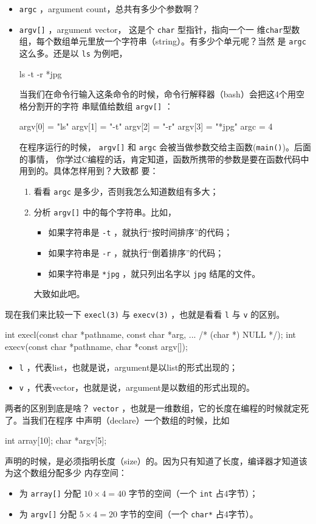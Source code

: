 \documentclass{wx672ctexart}
\begin{document}
\begin{itemize}
\item \texttt{argc} ，argument count，总共有多少个参数啊？
\item \texttt{argv[]} ，argument vector， 这是个 \texttt{char} 型指针，指向一个一
  维\texttt{char}型数组，每个数组单元里放一个字符串（string）。有多少个单元呢？当然
  是 \texttt{argc} 这么多。还是以 \texttt{ls} 为例吧，
\begin{shellcode}
ls -t -r *jpg
\end{shellcode}
当我们在命令行输入这条命令的时候，命令行解释器（bash）会把这4个用空格分割开的字符
串赋值给数组 \texttt{argv[]} ：
\begin{ccode}
argv[0] = "ls"
argv[1] = "-t"
argv[2] = "-r"
argv[3] = "*jpg"
argc = 4
\end{ccode}
在程序运行的时候， \texttt{argv[]} 和 \texttt{argc} 会被当做参数交给主函数(\texttt{main()})。后面的事情，
你学过C编程的话，肯定知道，函数所携带的参数是要在函数代码中用到的。具体怎样用到？大致都
要：
\begin{enumerate}
\item 看看 \texttt{argc} 是多少，否则我怎么知道数组有多大；
\item 分析 \texttt{argv[]} 中的每个字符串。比如，
\begin{itemize}
\item 如果字符串是 \texttt{-t} ，就执行“按时间排序”的代码；
\item 如果字符串是 \texttt{-r} ，就执行“倒着排序”的代码；
\item 如果字符串是 \texttt{*jpg} ，就只列出名字以 \texttt{jpg} 结尾的文件。
\end{itemize}
大致如此吧。
\end{enumerate}
\end{itemize}

现在我们来比较一下 \texttt{execl(3)} 与 \texttt{execv(3)} ，也就是看看 \texttt{l} 与 \texttt{v} 的区别。
\begin{ccode}
int execl(const char *pathname, const char *arg, ... /* (char  *) NULL */);
int execv(const char *pathname, char *const argv[]);
\end{ccode}
\begin{itemize}
\item \texttt{l} ，代表list，也就是说，argument是以list的形式出现的；
\item \texttt{v} ，代表vector，也就是说，argument是以数组的形式出现的。
\end{itemize}
两者的区别到底是啥？ \texttt{vector} ，也就是一维数组，它的长度在编程的时候就定死了。当我们在程序
中声明（declare）一个数组的时候，比如
\begin{ccode}
int array[10];
char *argv[5];
\end{ccode}
声明的时候，是必须指明长度（size）的。因为只有知道了长度，编译器才知道该为这个数组分配多少
内存空间：
\begin{itemize}
\item 为 \texttt{array[]} 分配 \(10\times 4 = 40\) 字节的空间（一个 \texttt{int} 占4字节）；
\item 为 \texttt{argv[]} 分配 \(5\times 4 = 20\) 字节的空间（一个 \texttt{char*} 占4字节）。
\end{itemize}
\end{document}

